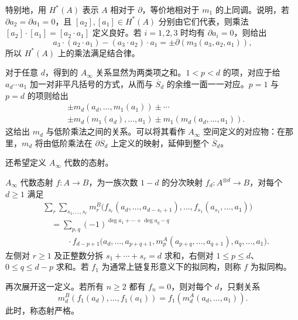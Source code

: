 特别地，用 $H^*(A)$ 表示 $A$ 相对于 $\partial$，等价地相对于 $m_1$ 的上同调。说明，若 $\partial a_2=\partial a_1=0$，且 $[a_2],[a_1]\in H^*(A)$ 分别由它们代表，则乘法 $[a_2]\cdot[a_1]=[a_2\cdot a_1]$ 定义良好。若 $i=1,2,3$ 时均有 $\partial a_i=0$，则给出
\[
a_3\cdot(a_2\cdot a_1)-(a_3\cdot a_2)\cdot a_1
=\pm\partial(m_3(a_3,a_2,a_1)),
\]
所以 $H^*(A)$ 上的乘法满足结合律。

对于任意 $d$，得到的 $A_\infty$ 关系显然为两类项之和。$1<p<d$ 的项，对应于给 $a_d\cdots a_1$ 加一对非平凡括号的方式，从而与 $\overline S_d$ 的余维一面一一对应。$p=1$ 与 $p=d$ 的项则给出
\[
\begin{aligned}
&\pm m_d(a_d,\ldots,m_1(a_1))\pm\cdots\\
&\pm m_d(m_1(a_d),\ldots,a_1)
\pm m_1(m_d(a_d,\ldots,a_1)).
\end{aligned}
\]
这给出 $m_d$ 与低阶乘法之间的关系。可以将其看作 $A_\infty$ 空间定义的对应物：在那里，$m_d$ 将由低阶乘法在 $\partial\overline S_d$ 上定义的映射，延伸到整个 $\overline S_d$。

还希望定义 $A_\infty$ 代数的态射。
\begin{definition}\label{def:8.5}
$A_\infty$ 代数态射 $f\colon A\to B$，为一族次数 $1-d$ 的分次映射 $f_d\colon A^{\otimes d}\to B$，对每个 $d\geq1$ 满足
\begin{equation}\label{eq:8.6}
\begin{aligned}
&\sum_{r}\sum_{s_1,\ldots,s_r}
m_r^B\bigl(f_{s_r}(a_d,\ldots,a_{d-s_r+1}),\ldots,
f_{s_1}(a_{s_1},\ldots,a_1)\bigr)\\
&\quad=\sum_{p,q}(-1)^{\deg a_1+\cdots+\deg a_q-q}\\
&\qquad\quad\cdot f_{d-p+1}\bigl(a_d,\ldots,a_{p+q+1},
m_p^A(a_{p+q},\ldots,a_{q+1}),a_q,\ldots,a_1\bigr).
\end{aligned}
\end{equation}
左侧对 $r\geq1$ 及正整数分拆 $s_1+\cdots+s_r=d$ 求和，右侧对 $1\leq p\leq d$、$0\leq q\leq d-p$ 求和。若 $f_1$ 为通常上链复形意义下的拟同构，则称 $f$ 为拟同构。
\end{definition}

再次展开这一定义。若所有 $n\geq2$ 都有 $f_n=0$，则对每个 $d$，只剩关系
\begin{equation}\label{eq:8.7}
m_d^B(f_1(a_d),\ldots,f_1(a_1))
=f_1(m_d^A(a_d,\ldots,a_1)).
\end{equation}
此时，称态射严格。

